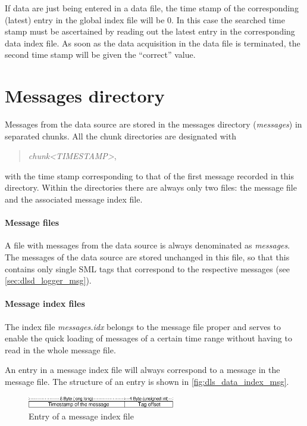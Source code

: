 \documentclass[a4paper,12pt,BCOR6mm,bibtotoc,idxtotoc]{scrbook}
\begin{document}
If data are just being entered in a data file, the time stamp of the corresponding (latest) entry in the global index file will be 0. In this case the searched time stamp must be ascertained by reading out the latest entry in the corresponding data index file. As soon as the data acquisition in the data file is terminated, the second time stamp will be given the ``correct'' value.


\section{Messages directory}
\label{sec:data_msg}

Messages from the data source are stored in the messages directory (\textit{messages}) in separated chunks. All the chunk directories are designated with

\begin{quote} \textit{chunk\textless TIMESTAMP\textgreater}, \end{quote}

with the time stamp corresponding to that of the first message recorded in this directory. Within the directories there are always only two files: the message file and the associated message index file.

\paragraph{Message files} A file with messages from the data source is always
denominated as \textit{messages}. The messages of the data source are stored
unchanged in this file, so that this contains only single SML tags that
correspond to the respective messages (see \autoref{sec:dlsd_logger_msg}).

\paragraph{Message index files} The index file \textit{messages.idx} belongs to the message file proper and serves to enable the quick loading of messages of a certain time range without having to read in the whole message file.

An entry in a message index file will always correspond to a message in the
message file. The structure of an entry is shown in
\autoref{fig:dls_data_index_msg}.

\begin{figure}[htb] \begin{center} \includegraphics[height=15pt]{bilder/dls_data_index_msg_en} \end{center} \caption{Entry of a message index file} \label{fig:dls_data_index_msg} \end{figure}
\end{document}
